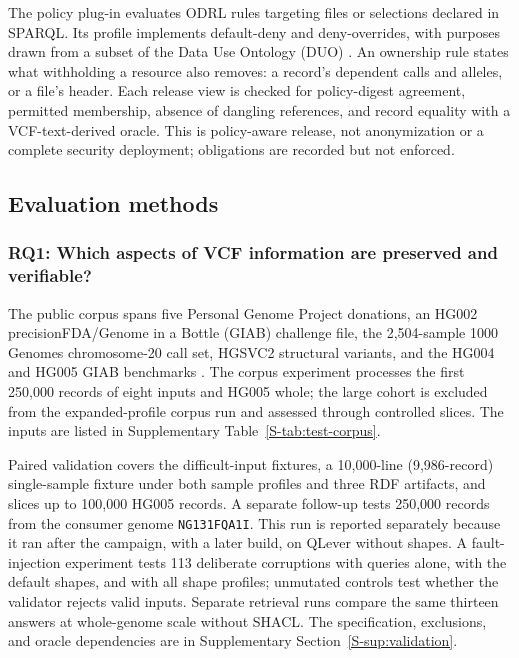 \documentclass[pdflatex,sn-mathphys-num]{sn-jnl}
\begin{document}
The policy plug-in evaluates ODRL rules targeting files or selections declared in SPARQL. 
Its profile implements default-deny and deny-overrides, with purposes drawn from a subset of the Data Use Ontology (DUO) \cite{odrl_2018,lawson2021duo}. 
An ownership rule states what withholding a resource also removes: a record's dependent calls and alleles, or a file's header. 
Each release view is checked for policy-digest agreement, permitted membership, absence of dangling references, and record equality with a VCF-text-derived oracle. 
This is policy-aware release, not anonymization or a complete security deployment; obligations are recorded but not enforced.

\subsection{Evaluation methods}\label{sec:design}\label{subsec2.3}
\subsubsection{RQ1: Which aspects of VCF information are preserved and verifiable?}
The public corpus spans five Personal Genome Project donations, an HG002 precisionFDA/Genome in a Bottle (GIAB) challenge file, the 2,504-sample 1000 Genomes chromosome-20 call set, HGSVC2 structural variants, and the HG004 and HG005 GIAB benchmarks \cite{personal_genome_proj,nist_gib_2025,thousand_genomes_2015,hgsvc_2021,giab_v421_2022}. 
The corpus experiment processes the first 250,000 records of eight inputs and HG005 whole; the large cohort is excluded from the expanded-profile corpus run and assessed through controlled slices. 
The inputs are listed in Supplementary Table~\ref{S-tab:test-corpus}.

Paired validation covers the difficult-input fixtures, a 10,000-line (9,986-record) single-sample fixture under both sample profiles and three RDF artifacts, and slices up to 100,000 HG005 records. 
A separate follow-up tests 250,000 records from the consumer genome \texttt{NG131FQA1I}. 
This run is reported separately because it ran after the campaign, with a later build, on QLever without shapes. 
A fault-injection experiment tests 113 deliberate corruptions with queries alone, with the default shapes, and with all shape profiles; unmutated controls test whether the validator rejects valid inputs. 
Separate retrieval runs compare the same thirteen answers at whole-genome scale without SHACL. 
The specification, exclusions, and oracle dependencies are in Supplementary Section~\ref{S-sup:validation}.
\end{document}
